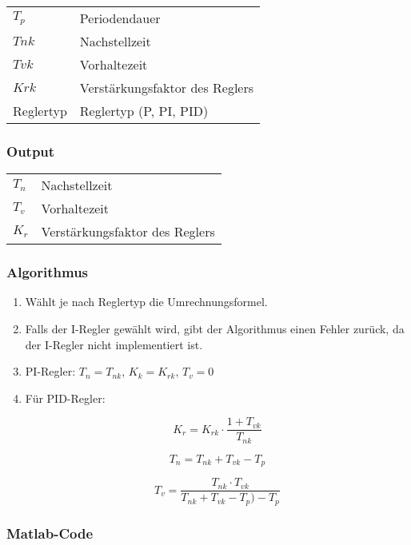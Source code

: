 \begin{tabular}{p{40mm}l}
    $ T_p  $ & Periodendauer \\
    $ T{nk} $ & Nachstellzeit \\
    $ T{vk} $ & Vorhaltezeit \\
    $ K{rk} $ & Verst\"arkungsfaktor des Reglers \\
      Reglertyp   & Reglertyp (P, PI, PID)
\end{tabular}

\subsubsection*{Output}
\begin{tabular}{p{40mm}l}
    $ T_n $ & Nachstellzeit \\
    $ T_v $ & Vorhaltezeit \\
    $ K_r $ & Verst\"arkungsfaktor des Reglers
\end{tabular}

\subsubsection*{Algorithmus}
\begin{enumerate}
    \item
        W\"ahlt je nach Reglertyp die Umrechnungsformel.
    \item
        Falls der I-Regler gew\"ahlt wird, gibt der Algorithmus einen Fehler zur\"uck, da der I-Regler nicht implementiert ist.
    \item
        PI-Regler:
        $T_{n} = T_{nk}$, $K_{k} = K_{rk}$, $T_{v} = 0$
    \item
       F\"ur PID-Regler:

       \begin{equation*}
           K_r= K_{rk} \cdot \frac{1+T_{vk}}{T_{nk}}
       \end{equation*}

       \begin{equation*}
           T_n= T_{nk}+T_{vk}-T_p
       \end{equation*}

       \begin{equation*}
           T_v = \frac{T_{nk} \cdot T_{vk}}{T_{nk}+T_{vk}-T_p)-T_p}
       \end{equation*}

\end{enumerate}

\subsubsection*{Matlab-Code}



